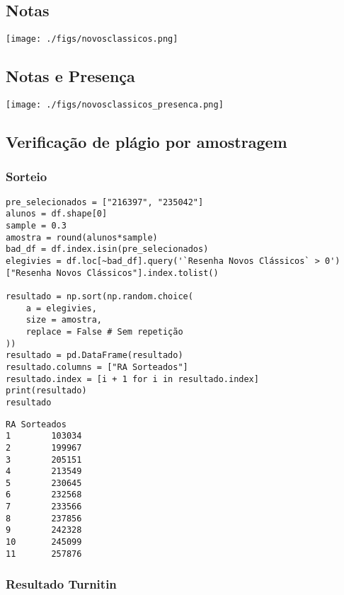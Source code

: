 \documentclass[11pt]{article}
\begin{document}
\subsection{Notas}
\label{sec:org857011d}
\begin{center}
\texttt{[image: ./figs/novosclassicos.png]}
\end{center}
\subsection{Notas e Presença}
\label{sec:orge49692c}
\begin{center}
\texttt{[image: ./figs/novosclassicos\_presenca.png]}
\end{center}
\subsection{Verificação de plágio por amostragem}
\label{sec:orgc142690}
\subsubsection{Sorteio}
\label{sec:org14f48cf}

\begin{verbatim}
pre_selecionados = ["216397", "235042"]
alunos = df.shape[0]
sample = 0.3
amostra = round(alunos*sample)
bad_df = df.index.isin(pre_selecionados)
elegivies = df.loc[~bad_df].query('`Resenha Novos Clássicos` > 0')["Resenha Novos Clássicos"].index.tolist()

resultado = np.sort(np.random.choice(
    a = elegivies,
    size = amostra,
    replace = False # Sem repetição
))
resultado = pd.DataFrame(resultado)
resultado.columns = ["RA Sorteados"]
resultado.index = [i + 1 for i in resultado.index]
print(resultado)
resultado
\end{verbatim}

\begin{verbatim}
RA Sorteados
1        103034
2        199967
3        205151
4        213549
5        230645
6        232568
7        233566
8        237856
9        242328
10       245099
11       257876
\end{verbatim}





\subsubsection{Resultado Turnitin}
\label{sec:orgca82a31}
\end{document}
